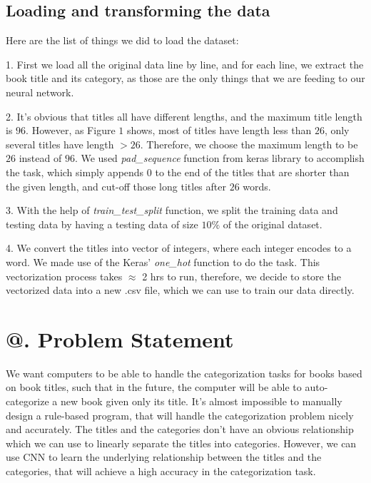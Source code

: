 \documentclass[jou,apacite, 10px]{apa6}
\makeatletter
\newcommand*{\rom}[1]{\expandafter\@slowromancap\romannumeral #1@}
\makeatother
\begin{document}
\subsection{Loading and transforming the data}
Here are the list of things we did to load the dataset:

\rule{0pt}{4ex}  1. First we load all the original data line by line, and for each line, we extract the book title and its category, as those are the only things that we are feeding to our neural network.

\rule{0pt}{4ex}  2. It's obvious that titles all have different lengths, and the maximum title length is $96$. However, as Figure $1$ shows, most of titles have length less than $26$, only several titles have length $>26$. Therefore, we choose the maximum length to be $26$ instead of $96$. We used \textit{pad\_sequence} function from keras library to accomplish the task, which simply appends $0$ to the end of the titles that are shorter than the given length, and cut-off those long titles after $26$ words.

\rule{0pt}{4ex}  3. With the help of \textit{train\_test\_split} function, we split the training data and testing data by having a testing data of size $10\%$ of the original dataset.

\rule{0pt}{4ex}  4. We convert the titles into vector of integers, where each integer encodes to a word. We made use of the Keras' \textit{one\_hot} function to do the task. This vectorization process takes $\approx$ 2 hrs to run, therefore, we decide to store the vectorized data into a new .csv file, which we can use to train our data directly.\\

\section{\rom{3}. Problem Statement}

We want computers to be able to handle the categorization tasks for books based on book titles, such that in the future, the computer will be able to auto-categorize a new book given only its title. It's almost impossible to manually design a rule-based program, that will handle the categorization problem nicely and accurately. The titles and the categories don't have an obvious relationship which we can use to linearly separate the titles into categories. However, we can use CNN to learn the underlying relationship between the titles and the categories, that will achieve a high accuracy in the categorization task.\\
\end{document}
